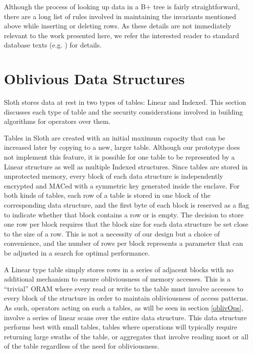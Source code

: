 \documentclass[USenglish,oneside,twocolumn]{article}
\def\name/{Sloth}
\begin{document}
Although the process of looking up data in a B+ tree is fairly straightforward, there are a long list of rules involved in maintaining the invariants mentioned above while inserting or deleting rows. As these details are not immediately relevant to the work presented here, we refer the interested reader to standard database texts (e.g. \cite{EN10}) for details. 

\section{Oblivious Data Structures}\label{oblivData}
\name/ stores data at rest in two types of tables: Linear and Indexed. This section discusses each type of table and the security considerations involved in building algorithms for operators over them. 

Tables in \name/ are created with an initial maximum capacity that can be increased later by copying to a new, larger table. Although our prototype does not implement this feature, it is possible for one table to be represented by a Linear structure as well as multiple Indexed structures. Since tables are stored in unprotected memory, every block of each data structure is independently encrypted and MACed with a symmetric key generated inside the enclave. For both kinds of tables, each row of a table is stored in one block of the corresponding data structure, and the first byte of each block is reserved as a flag to indicate whether that block contains a row or is empty. The decision to store one row per block requires that the block size for each data structure be set close to the size of a row. This is not a necessity of our design but a choice of convenience, and the number of rows per block represents a parameter that can be adjusted in a search for optimal performance.

A Linear type table simply stores rows in a series of adjacent blocks with no additional mechanism to ensure obliviousness of memory accesses. This is a ``trivial'' ORAM where every read or write to the table must involve accesses to every block of the structure in order to maintain obliviousness of access patterns. As such, operators acting on such a tables, as will be seen in section \ref{oblivOps}, involve a series of linear scans over the entire data structure. This data structure performs best with small tables, tables where operations will typically require returning large swaths of the table, or aggregates that involve reading most or all of the table regardless of the need for obliviousness.
\end{document}
